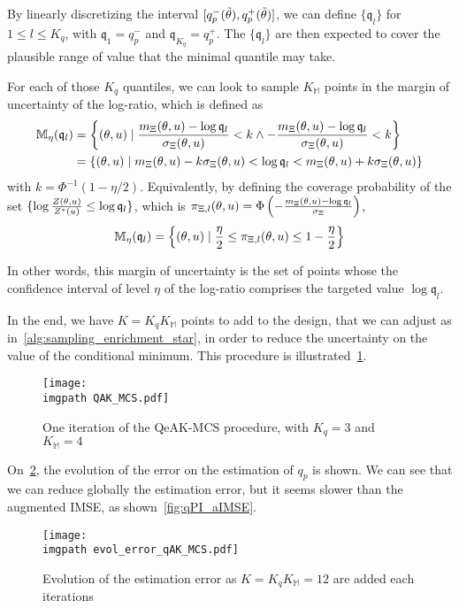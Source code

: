 \documentclass[../../Main_ManuscritThese.tex]{subfiles}
\newcommand\imgpath{/home/victor/acadwriting/Manuscrit/Text/Chapter4/img/}
\begin{document}
By linearly discretizing the interval $\interval{q^-_p(\tilde{\kk})}{q^+_p(\tilde{\kk})}$, we can define $\{\mathfrak{q}_l\}$ for $1 \leq l \leq K_q$, with $\mathfrak{q}_1 = q^-_p$ and $\mathfrak{q}_{K_q} = q^+_p$. The $\{\mathfrak{q}_l\}$ are then expected to cover the plausible range of value that the minimal quantile may take. %

For each of those $K_q$ quantiles, we can look to sample $K_{\mathbb{M}}$ points in the margin of uncertainty of the log-ratio, which is defined as
\begin{align}
  \mathbb{M}_{\eta}(\mathfrak{q}_l)  &= \left\{ (\theta, u) \mid \frac{m_{\Xi}(\theta, u) - \log \mathfrak{q}_l}{\sigma_{\Xi}(\theta, u)}< k \land -\frac{m_{\Xi}(\theta, u)-\log \mathfrak{q}_l}{\sigma_\Xi(\theta, u)}  <  k\right\} \\
                                     &= \{(\theta, u) \mid m_{\Xi}(\theta,u) - k\sigma_{\Xi}(\theta, u) < \log \mathfrak{q}_l < m_{\Xi}(\theta, u) + k\sigma_{\Xi}(\theta, u)\}
\end{align}
with $k = \Phi^{-1}(1-\eta/2)$. Equivalently, by defining the coverage probability of the set $\{\log \frac{Z(\theta,u)}{Z^*(u)}\leq \log \mathfrak{q}_l\}$, which is $\pi_{\Xi,l}(\theta, u) = \Phi\left(-\frac{m_{\Xi}(\theta, u) - \log \mathfrak{q}_l}{\sigma_{\Xi}}\right)$, 
\begin{equation}
  \mathbb{M}_{\eta}(\mathfrak{q}_l) = \left\{(\theta, u) \mid \frac{\eta}{2}\leq\pi_{\Xi,l}(\theta, u) \leq 1-\frac{\eta}{2}\right\}
\end{equation}

In other words, this margin of uncertainty is the set of points whose the confidence interval of level $\eta$ of the log-ratio comprises the targeted value $\log \mathfrak{q}_l$.

In the end, we have $K = K_qK_{\mathbb{M}}$ points to add to the design, that we can adjust as in~\cref{alg:sampling_enrichment_star}, in order to reduce the uncertainty on the value of the conditional minimum. This procedure is illustrated~\cref{fig:QAK_MCS}.
\begin{figure}[ht]
  \centering
  \texttt{[image: \\imgpath QAK\_MCS.pdf]}
  \caption{\label{fig:QAK_MCS} One iteration of the QeAK-MCS procedure, with $K_q=3$ and $K_{\mathbb{M}}=4$}
\end{figure}
On~\cref{fig:evol_error_qAK_MCS}, the evolution of the error on the estimation of $q_p$ is shown. We can see that we can reduce globally the estimation error, but it seems slower than the augmented IMSE, as shown~\cref{fig:qPI_aIMSE}. 
\begin{figure}[ht]
  \centering
  \texttt{[image: \\imgpath evol\_error\_qAK\_MCS.pdf]}
  \caption{\label{fig:evol_error_qAK_MCS} Evolution of the estimation error as $K=K_qK_{\mathbb{M}}=12$ are added each iterations}
\end{figure}
\end{document}
